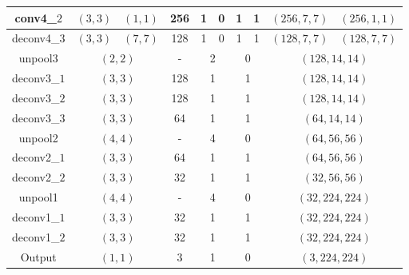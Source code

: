 \documentclass[a4paper, 11pt]{report}
\begin{document}
\begin{tabular}{|c|c|c|c|c|c|c|c|c|c|c|}
\hline
conv4\_$2$ & $(3,3)$ & $(1, 1)$ & \multicolumn{2}{c|}{256} & 1 & 0 & 1 & 1 & $(256, 7, 7)$ & $(256, 1, 1)$ \\
\hline
deconv4\_$3$ & $(3,3)$ & $(7, 7)$ & \multicolumn{2}{c|}{128} & 1 & 0 & 1 & 1 & $(128, 7, 7)$ & $(128, 7, 7)$ \\
\hline
unpool3 & \multicolumn{2}{c|}{$(2, 2)$} & \multicolumn{2}{c|}{-} & \multicolumn{2}{c|}{2} & \multicolumn{2}{c|}{0} & \multicolumn{2}{c|}{$(128, 14, 14)$}\\ 
\hline
deconv3\_$1$ & \multicolumn{2}{c|}{$(3, 3)$} & \multicolumn{2}{c|}{128} & \multicolumn{2}{c|}{1} & \multicolumn{2}{c|}{1} & \multicolumn{2}{c|}{$(128, 14, 14)$}\\ 
\hline
deconv3\_$2$ & \multicolumn{2}{c|}{$(3, 3)$} & \multicolumn{2}{c|}{128} & \multicolumn{2}{c|}{1} & \multicolumn{2}{c|}{1} & \multicolumn{2}{c|}{$(128, 14, 14)$}\\ 
\hline
deconv3\_$3$ & \multicolumn{2}{c|}{$(3, 3)$} & \multicolumn{2}{c|}{64} & \multicolumn{2}{c|}{1} & \multicolumn{2}{c|}{1} & \multicolumn{2}{c|}{$(64, 14, 14)$}\\ 
\hline
unpool2 & \multicolumn{2}{c|}{$(4, 4)$} & \multicolumn{2}{c|}{-} & \multicolumn{2}{c|}{4} & \multicolumn{2}{c|}{0} & \multicolumn{2}{c|}{$(64, 56, 56)$}\\ 
\hline
deconv2\_$1$ & \multicolumn{2}{c|}{$(3, 3)$} & \multicolumn{2}{c|}{64} & \multicolumn{2}{c|}{1} & \multicolumn{2}{c|}{1} & \multicolumn{2}{c|}{$(64, 56, 56)$}\\ 
\hline
deconv2\_$2$ & \multicolumn{2}{c|}{$(3, 3)$} & \multicolumn{2}{c|}{32} & \multicolumn{2}{c|}{1} & \multicolumn{2}{c|}{1} & \multicolumn{2}{c|}{$(32, 56, 56)$}\\ 
\hline
unpool1 & \multicolumn{2}{c|}{$(4, 4)$} & \multicolumn{2}{c|}{-} & \multicolumn{2}{c|}{4} & \multicolumn{2}{c|}{0} & \multicolumn{2}{c|}{$(32, 224, 224)$}\\ 
\hline
deconv1\_$1$ & \multicolumn{2}{c|}{$(3, 3)$} & \multicolumn{2}{c|}{32} & \multicolumn{2}{c|}{1} & \multicolumn{2}{c|}{1} & \multicolumn{2}{c|}{$(32, 224, 224)$}\\ 
\hline
deconv1\_$2$ & \multicolumn{2}{c|}{$(3, 3)$} & \multicolumn{2}{c|}{32} & \multicolumn{2}{c|}{1} & \multicolumn{2}{c|}{1} & \multicolumn{2}{c|}{$(32, 224, 224)$}\\ 
\hline
Output & \multicolumn{2}{c|}{$(1, 1)$} & \multicolumn{2}{c|}{3} & \multicolumn{2}{c|}{1} & \multicolumn{2}{c|}{0} & \multicolumn{2}{c|}{$(3, 224, 224)$}\\ 
\hline
\end{tabular} 
\end{document}
